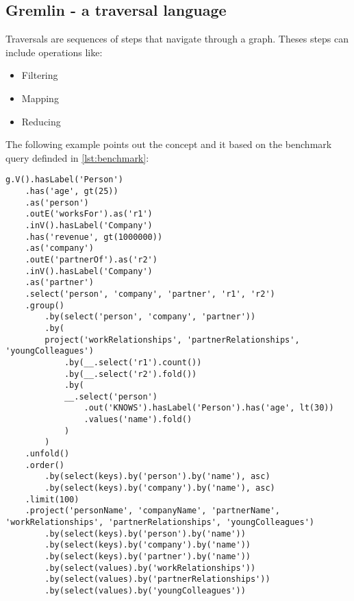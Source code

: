 \subsection{Gremlin - a traversal language}
Traversals are sequences of steps that navigate through a graph. Theses steps can include operations
like:
\begin{itemize}
	\item Filtering
	\item Mapping 
	\item Reducing
\end{itemize}
The following example points out the concept and it based on the benchmark query definded in \cref{lst:benchmark}:
\begin{lstlisting}[caption={Benchmark Query in Gremlin}, label={lst:benchmarkGremlin}] 
	g.V().hasLabel('Person')
	.has('age', gt(25))
	.as('person')
	.outE('worksFor').as('r1')
	.inV().hasLabel('Company')
	.has('revenue', gt(1000000))
	.as('company')
	.outE('partnerOf').as('r2')
	.inV().hasLabel('Company')
	.as('partner')
	.select('person', 'company', 'partner', 'r1', 'r2')
	.group()
		.by(select('person', 'company', 'partner'))
		.by(
		project('workRelationships', 'partnerRelationships', 'youngColleagues')
			.by(__.select('r1').count())
			.by(__.select('r2').fold())
			.by(
			__.select('person')
				.out('KNOWS').hasLabel('Person').has('age', lt(30))
				.values('name').fold()
			)
		)
	.unfold()
	.order()
		.by(select(keys).by('person').by('name'), asc)
		.by(select(keys).by('company').by('name'), asc)
	.limit(100)
	.project('personName', 'companyName', 'partnerName', 'workRelationships', 'partnerRelationships', 'youngColleagues')
		.by(select(keys).by('person').by('name'))
		.by(select(keys).by('company').by('name'))
		.by(select(keys).by('partner').by('name'))
		.by(select(values).by('workRelationships'))
		.by(select(values).by('partnerRelationships'))
		.by(select(values).by('youngColleagues'))
\end{lstlisting}

